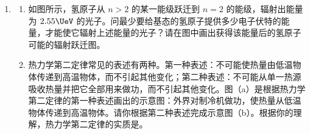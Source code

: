 \documentclass[\gkver]{gaokaozhenti}
\begin{document}
\begin{enumerate}
\begin{enumerate}
	\item
	在图（a）的方框中画出实验电路图，要求测量误差尽可能小。


	\item
	根据电路图，在图（b）的实物图上连线。


	\item
	简要写出完成接线后的主要实验步骤。
\end{enumerate}



\item
\begin{enumerate}
	\item
	如图所示，氢原子从 $n>2$ 的某一能级跃迁到 $n=2$ 的能级，辐射出能量为 $2.55\UeV$ 的光子。问最少要给基态的氢原子提供多少电子伏特的能量，才能使它辐射上述能量的光子？请在图中画出获得该能量后的氢原子可能的辐射跃迁图。


	\item
	热力学第二定律常见的表述有两种。第一种表述：不可能使热量由低温物体传递到高温物体，而不引起其他变化；第二种表述：不可能从单一热源吸收热量并把它全部用来做功，而不引起其他变化。图（a）是根据热力学第二定律的第一种表述画出的示意图：外界对制冷机做功，使热量从低温物体传递到高温物体。请你根据第二种表述完成示意图（b）。根据你的理解，热力学第二定律的实质是。


\end{enumerate}
\end{enumerate}
\end{document}
